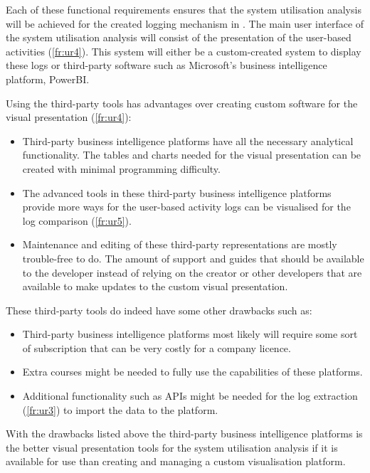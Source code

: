 \clearpage

Each of these functional requirements ensures that the system utilisation analysis will be achieved for the created logging mechanism in . The main user interface of the system utilisation analysis will consist of the presentation of the user-based activities (\ref{fr:ur4}). This system will either be a custom-created system to display these logs or third-party software such as Microsoft's business intelligence platform, PowerBI. \par Using the third-party tools has advantages over creating custom software for the visual presentation (\ref{fr:ur4}):

\begin{itemize}
	\item Third-party business intelligence platforms have all the necessary analytical functionality. The tables and charts needed for the visual presentation can be created with minimal programming difficulty.
	\item The advanced tools in these third-party business intelligence platforms provide more ways for the user-based activity logs can be visualised for the log comparison (\ref{fr:ur5}).
	\item Maintenance and editing of these third-party representations are mostly trouble-free to do. The amount of support and guides that should be available to the developer instead of relying on the creator or other developers that are available to make updates to the custom visual presentation.
\end{itemize}

These third-party tools do indeed have some other drawbacks such as:

\begin{itemize}
	\item Third-party business intelligence platforms most likely will require some sort of subscription that can be very costly for a company licence.
	\item Extra courses might be needed to fully use the capabilities of these platforms.
	\item Additional functionality such as APIs might be needed for the log extraction (\ref{fr:ur3}) to import the data to the platform.
\end{itemize}

With the drawbacks listed above the third-party business intelligence platforms is the better visual presentation tools for the system utilisation analysis if it is available for use than creating and managing a custom visualisation platform.

